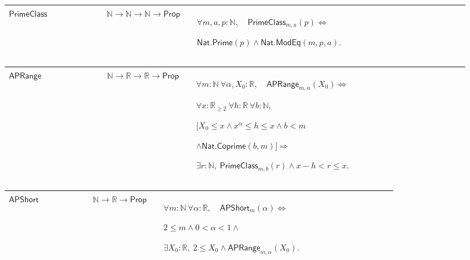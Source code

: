 \documentclass[12pt,reqno]{amsart}
\newcommand{\N}{\mathbb N}
\newcommand{\R}{\mathbb R}
\theoremstyle{blueplain}
\numberwithin{equation}{section}
\def\hyperlink#1#2{#2}}
\begin{document}
\par\setlength{\parskip}{0pt}\nointerlineskip
\noindent
\begin{tabular}{|@{}p{0.19251\linewidth}|p{0.16845\linewidth}|p{0.53904\linewidth}|}\hline
{\hypertarget{def:PrimeClass}{\(\textsf{PrimeClass}\)}} & {\(\N\to\N\to\N\to\textsf{Prop}\)} & {\(\displaystyle \forall m,a,p:\N,\quad \hyperlink{def:PrimeClass}{\ensuremath{\textsf{PrimeClass}}}_{m,a}(p)\Longleftrightarrow\)
\par
\(\displaystyle \hyperlink{def:Nat.Prime}{\ensuremath{\textsf{Nat.Prime}}}(p)\wedge \hyperlink{def:Nat.ModEq}{\ensuremath{\textsf{Nat.ModEq}}}(m,p,a).\)}\\
\hline
\end{tabular}%
\par\setlength{\parskip}{0pt}\nointerlineskip
\noindent
\begin{tabular}{|@{}p{0.19251\linewidth}|p{0.16845\linewidth}|p{0.53904\linewidth}|}\hline
{\hypertarget{def:APRange}{\(\textsf{APRange}\)}} & {\(\N\to\R\to\R\to\textsf{Prop}\)} & {\(\displaystyle \forall m:\N\ \forall\alpha,X_0:\R,\quad \hyperlink{def:APRange}{\ensuremath{\textsf{APRange}}}_{m,\alpha}(X_0)\Longleftrightarrow\)
\par
\(\displaystyle \forall x:\R_{\ge2}\ \forall h:\R\ \forall b:\N,\)
\par
\(\displaystyle \bigl[X_0\le x\wedge x^\alpha\le h\le x\wedge b<m\)
\par
\(\displaystyle \wedge \hyperlink{def:Nat.Coprime}{\ensuremath{\textsf{Nat.Coprime}}}(b,m)\bigr]\Rightarrow\)
\par
\(\displaystyle \exists r:\N,\ \hyperlink{def:PrimeClass}{\ensuremath{\textsf{PrimeClass}}}_{m,b}(r)\wedge x-h<r\le x.\)}\\
\hline
\end{tabular}%
\par\setlength{\parskip}{0pt}\nointerlineskip
\noindent
\begin{tabular}{|@{}p{0.19251\linewidth}|p{0.16845\linewidth}|p{0.53904\linewidth}|}\hline
{\hypertarget{def:APShort}{\(\textsf{APShort}\)}} & {\(\N\to\R\to\textsf{Prop}\)} & {\(\displaystyle \forall m:\N\ \forall\alpha:\R,\quad \hyperlink{def:APShort}{\ensuremath{\textsf{APShort}}}_m(\alpha)\Longleftrightarrow\)
\par
\(\displaystyle 2\le m\wedge0<\alpha<1\wedge\)
\par
\(\displaystyle \exists X_0:\R,\ 2\le X_0\wedge \hyperlink{def:APRange}{\ensuremath{\textsf{APRange}}}_{m,\alpha}(X_0).\)}\\
\hline
\end{tabular}%
\end{document}
